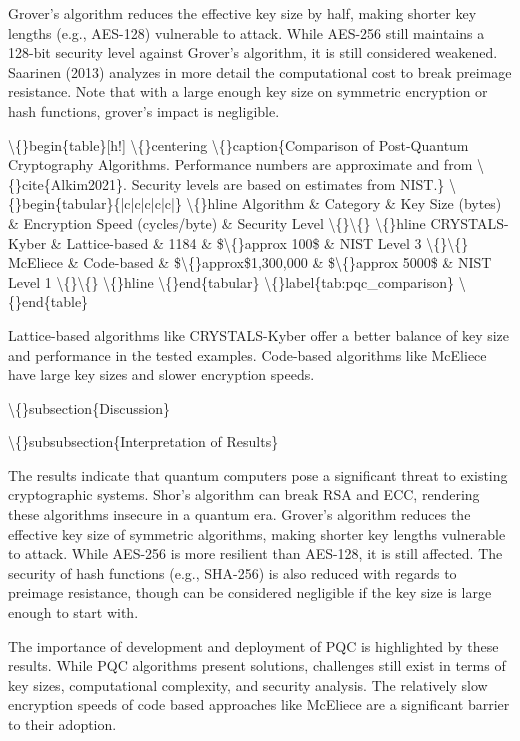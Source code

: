 \documentclass{article}
\begin{document}
Grover's algorithm reduces the effective key size by half, making shorter key lengths (e.g., AES-128) vulnerable to attack. While AES-256 still maintains a 128-bit security level against Grover's algorithm, it is still considered weakened. Saarinen (2013) analyzes in more detail the computational cost to break preimage resistance. Note that with a large enough key size on symmetric encryption or hash functions, grover's impact is negligible.

\textbackslash\{\}begin\{table\}[h!]
\textbackslash\{\}centering
\textbackslash\{\}caption\{Comparison of Post-Quantum Cryptography Algorithms. Performance numbers are approximate and from \textbackslash\{\}cite\{Alkim2021\}. Security levels are based on estimates from NIST.\}
\textbackslash\{\}begin\{tabular\}\{|c|c|c|c|c|\}
\textbackslash\{\}hline
Algorithm \& Category \& Key Size (bytes) \& Encryption Speed (cycles/byte) \& Security Level \textbackslash\{\}\textbackslash\{\}
\textbackslash\{\}hline
CRYSTALS-Kyber \& Lattice-based \& 1184 \& \$\textbackslash\{\}approx 100\$ \& NIST Level 3 \textbackslash\{\}\textbackslash\{\}
McEliece \& Code-based \& \$\textbackslash\{\}approx\$1,300,000 \& \$\textbackslash\{\}approx 5000\$ \& NIST Level 1 \textbackslash\{\}\textbackslash\{\}
\textbackslash\{\}hline
\textbackslash\{\}end\{tabular\}
\textbackslash\{\}label\{tab:pqc\_comparison\}
\textbackslash\{\}end\{table\}

Lattice-based algorithms like CRYSTALS-Kyber offer a better balance of key size and performance in the tested examples. Code-based algorithms like McEliece have large key sizes and slower encryption speeds.

\textbackslash\{\}subsection\{Discussion\}

\textbackslash\{\}subsubsection\{Interpretation of Results\}

The results indicate that quantum computers pose a significant threat to existing cryptographic systems. Shor's algorithm can break RSA and ECC, rendering these algorithms insecure in a quantum era. Grover's algorithm reduces the effective key size of symmetric algorithms, making shorter key lengths vulnerable to attack. While AES-256 is more resilient than AES-128, it is still affected. The security of hash functions (e.g., SHA-256) is also reduced with regards to preimage resistance, though can be considered negligible if the key size is large enough to start with.

The importance of development and deployment of PQC is highlighted by these results. While PQC algorithms present solutions, challenges still exist in terms of key sizes, computational complexity, and security analysis. The relatively slow encryption speeds of code based approaches like McEliece are a significant barrier to their adoption.
\end{document}
